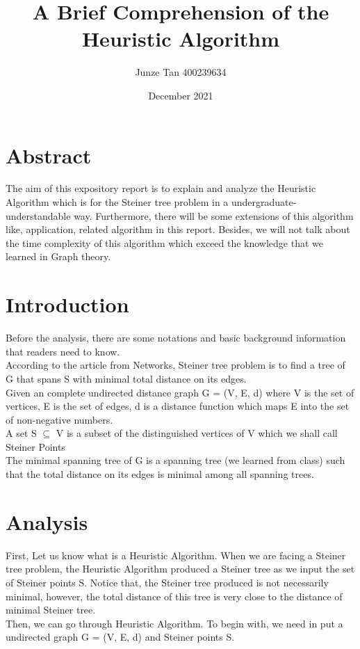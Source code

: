 \documentclass[letterpaper,11pt,twocolumn]{article}
\title{A Brief Comprehension of the Heuristic Algorithm}
\author{Junze Tan 400239634}
\date{December 2021}
\begin{document}
\maketitle %

\section{Abstract}
The aim of this expository report is to explain and analyze the Heuristic Algorithm which is for the Steiner tree problem in a undergraduate-understandable way. Furthermore, there will be some extensions of this algorithm like, application, related algorithm in this report. Besides, we will not talk about the time complexity of this algorithm which exceed the knowledge that we learned in Graph theory.


\section{Introduction}
Before the analysis, there are some notations and basic background information that readers need to know.\\
According to the article from Networks, Steiner tree problem is to find a tree of G that spans S with minimal total distance on its edges. \cite{treeProb}\\
Given an complete undirected distance graph G = (V, E, d) where V is the set of vertices, E is the set of edges, d is a distance function which maps E into the set of non-negative numbers.\\
A set S $\subseteq$ V is a subset of the distinguished vertices of V which we shall call Steiner Points \\
The minimal spanning tree of G is a spanning tree (we learned from class) such that the total distance on its edges is minimal among all spanning trees.\cite{treeProb}

\section{Analysis}
First, Let us know what is a Heuristic Algorithm. When we are facing a Steiner tree problem, the Heuristic Algorithm produced a Steiner tree as we input the set of Steiner points S. \cite{main} Notice that, the Steiner tree produced is not necessarily minimal, however, the total distance of this tree is very close to the distance of minimal Steiner tree.\\
Then, we can go through Heuristic Algorithm. To begin with, we need in put a undirected graph G = (V, E, d) and Steiner points S.
\end{document}
